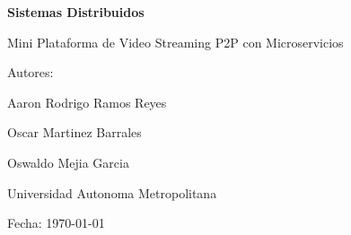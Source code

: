\begin{titlepage}
    \centering
    \vspace*{3cm}
    {\Huge\bfseries Sistemas Distribuidos \par}
    \vspace{2cm}
    {\Large Mini Plataforma de Video Streaming P2P con Microservicios\par}
    \vspace{3cm}
    {\large Autores:\par}
    \vspace{0.5cm}
    {\normalsize Aaron Rodrigo Ramos Reyes\par}
    {\normalsize Oscar Martinez Barrales\par}
    {\normalsize Oswaldo Mejia Garcia\par}
    \vfill
    {\large Universidad Autonoma Metropolitana\par}
    {\large Fecha: \today\par}
\end{titlepage}